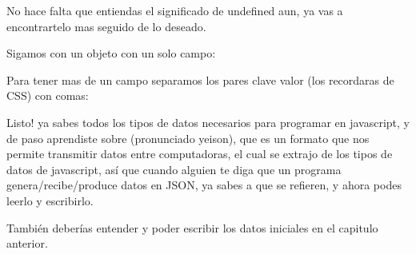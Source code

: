 \documentclass[letterpaper,10pt,spanish]{sphinxmanual}
\begin{document}
No hace falta que entiendas el significado de undefined aun, ya vas a
encontrartelo mas seguido de lo deseado.

Sigamos con un objeto con un solo campo:

%
\begin{sphinxVerbatim}[commandchars=\\\{\}]
 
\end{sphinxVerbatim}

%
\begin{sphinxVerbatim}[commandchars=\\\{\}]
  
\end{sphinxVerbatim}

Para tener mas de un campo separamos los pares clave valor (los recordaras de CSS) con comas:

%
\begin{sphinxVerbatim}[commandchars=\\\{\}]
     
\end{sphinxVerbatim}

%
\begin{sphinxVerbatim}[commandchars=\\\{\}]
      
\end{sphinxVerbatim}

Listo! ya sabes todos los tipos de datos necesarios para programar en
javascript, y de paso aprendiste sobre  (pronunciado yeison), que es un
formato que nos permite transmitir datos entre computadoras, el cual se extrajo
de los tipos de datos de javascript, así que cuando alguien te diga que un
programa genera/recibe/produce datos en JSON, ya sabes a que se refieren, y
ahora podes leerlo y escribirlo.

También deberías entender y poder escribir los datos iniciales en el capitulo
anterior.



\renewcommand{\indexname}{Índice}
\printindex
\end{document}

